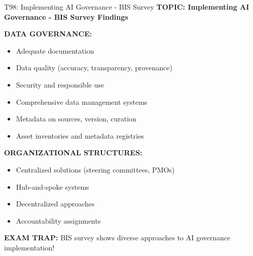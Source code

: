 \documentclass[8pt]{beamer}
\begin{document}
	\begin{frame}{T98: Implementing AI Governance - BIS Survey}
		\fontsize{6.5}{7.5}\selectfont
		\textbf{TOPIC: Implementing AI Governance - BIS Survey Findings}
		
		\vspace{0.1cm}
		\textbf{DATA GOVERNANCE:}
		\begin{itemize}
			\item Adequate documentation
			\item Data quality (accuracy, transparency, provenance)
			\item Security and responsible use
			\item Comprehensive data management systems
			\item Metadata on sources, version, curation
			\item Asset inventories and metadata registries
		\end{itemize}
		
		\vspace{0.1cm}
		\textbf{ORGANIZATIONAL STRUCTURES:}
		\begin{itemize}
			\item Centralized solutions (steering committees, PMOs)
			\item Hub-and-spoke systems
			\item Decentralized approaches
			\item Accountability assignments
		\end{itemize}
		
		\textcolor{myred}{\textbf{EXAM TRAP:}} BIS survey shows \textcolor{myblue}{diverse approaches to AI governance implementation}!
	\end{frame}
	
\end{document}
